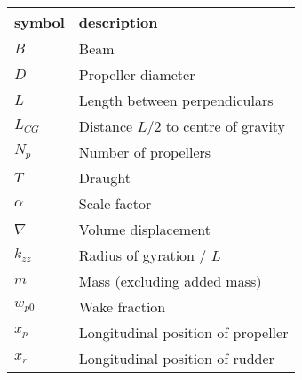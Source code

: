 \documentclass[review]{elsarticle}
\begin{document}
 \begin{savenotes}\sphinxattablestart
 \centering
 \sphinxthecaptionisattop
 \label{\detokenize{05.01_case_studies:list-of-main-dimensions-symbols}}
 \sphinxaftertopcaption
 \begin{tabulary}{\linewidth}[t]{|T|T|}
 \hline
 \sphinxstyletheadfamily 
 
 symbol
 &\sphinxstyletheadfamily 
 
 description
 \\
 \hline
 
 \(B\)
 &
 
 Beam
 \\
 \hline
 
 \(D\)
 &
 
 Propeller diameter
 \\
 \hline
 
 \(L\)
 &
 
 Length between perpendiculars
 \\
 \hline
 
 \(L_{CG}\)
 &
 
 Distance \(L/2\) to centre of gravity
 \\
 \hline
 
 \(N_p\)
 &
 
 Number of propellers
 \\
 \hline
 
 \(T\)
 &
 
 Draught
 \\
 \hline
 
 \(\alpha\)
 &
 
 Scale factor
 \\
 \hline
 
 \(\nabla\)
 &
 
 Volume displacement
 \\
 \hline
 
 \(k_{zz}\)
 &
 
 Radius of gyration / \(L\)
 \\
 \hline
 
 \(m\)
 &
 
 Mass (excluding added mass)
 \\
 \hline
 
 \(w_{p0}\)
 &
 
 Wake fraction
 \\
 \hline
 
 \(x_{p}\)
 &
 
 Longitudinal position of propeller
 \\
 \hline
 
 \(x_{r}\)
 &
 
 Longitudinal position of rudder
 \\
 \hline
 \end{tabulary}
 \par
 \sphinxattableend\end{savenotes}
\end{document}
